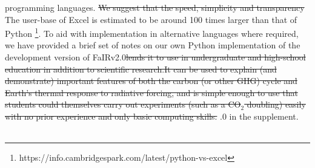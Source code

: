 \documentclass[gmd, manuscript]{copernicus}
\providecommand{\DIFadd}[1]{{\protect\color{blue}#1}} %
\providecommand{\DIFdel}[1]{{\protect\color{red}\sout{#1}}}                      %
\providecommand{\DIFaddbegin}{} %
\providecommand{\DIFaddend}{} %
\providecommand{\DIFdelbegin}{} %
\providecommand{\DIFdelend}{} %
\begin{document}
{}\DIFdelend programming languages. \DIFdelbegin %
\DIFdel{We suggest that the speed, simplicity and transparency }\DIFdelend \DIFaddbegin \DIFadd{The user-base of Excel is estimated to be around 100 times larger than that of Python }\footnote{\DIFadd{https://info.cambridgespark.com/latest/python-vs-excel}}\DIFadd{. To aid with implementation in alternative languages where required, we have provided a brief set of notes on our own Python implementation of the development version }\DIFaddend of FaIRv2.0\DIFdelbegin \DIFdel{lends it to use in undergraduate and high-school education in addition to scientific research.It can be used to explain (and demonstrate) important features of both the carbon (or other GHG) cycle and Earth's thermal response to radiative forcing, and is simple enough to use that students could themselves carry out experiments (such as a CO$_2$ doubling) easily with no prior experience and only basic computing skills. }\DIFdelend \DIFaddbegin \DIFadd{.0 in the supplement.}\DIFaddend \\\\
\end{document}
